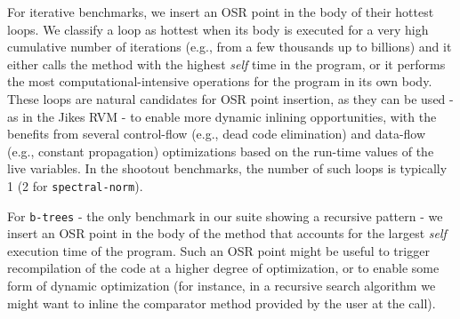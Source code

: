 For iterative benchmarks, we insert an OSR point in the body of their hottest loops. We classify a loop as hottest when its body is executed for a very high cumulative number of iterations (e.g., from a few thousands up to billions) and it either calls the method with the highest {\em self} time in the program, or it performs the most computational-intensive operations for the program in its own body. These loops are natural candidates for OSR point insertion, as they can be used - as in the Jikes RVM - to enable more dynamic inlining opportunities, with the benefits from several control-flow (e.g., dead code elimination) and data-flow (e.g., constant propagation) optimizations based on the run-time values of the live variables. In the shootout benchmarks, the number of such loops is typically 1 (2 for {\tt spectral-norm}).

For {\tt b-trees} - the only benchmark in our suite showing a recursive pattern - we insert an OSR point in the body of the method that accounts for the largest {\em self} execution time of the program. Such an OSR point might be useful to trigger recompilation of the code at a higher degree of optimization, or to enable some form of dynamic optimization (for instance, in a recursive search algorithm we might want to inline the comparator method provided by the user at the call).
  
  
  
  
  